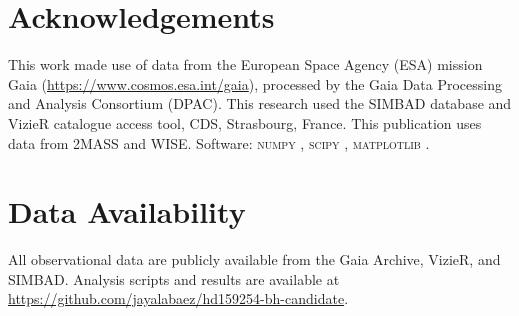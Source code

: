 \documentclass[usenatbib,fleqn]{mnras}
\begin{document}
\section*{Acknowledgements}

This work made use of data from the European Space Agency (ESA)
mission Gaia (\url{https://www.cosmos.esa.int/gaia}), processed by
the Gaia Data Processing and Analysis Consortium (DPAC).
This research used the SIMBAD database and VizieR catalogue access
tool, CDS, Strasbourg, France.
This publication uses data from 2MASS and WISE\@.
Software: \textsc{numpy} \citep{Harris2020},
\textsc{scipy} \citep{Virtanen2020},
\textsc{matplotlib} \citep{Hunter2007}.

\section*{Data Availability}

All observational data are publicly available from the Gaia Archive,
VizieR, and SIMBAD.
Analysis scripts and results are available at
\url{https://github.com/jayalabaez/hd159254-bh-candidate}.




\end{document}
